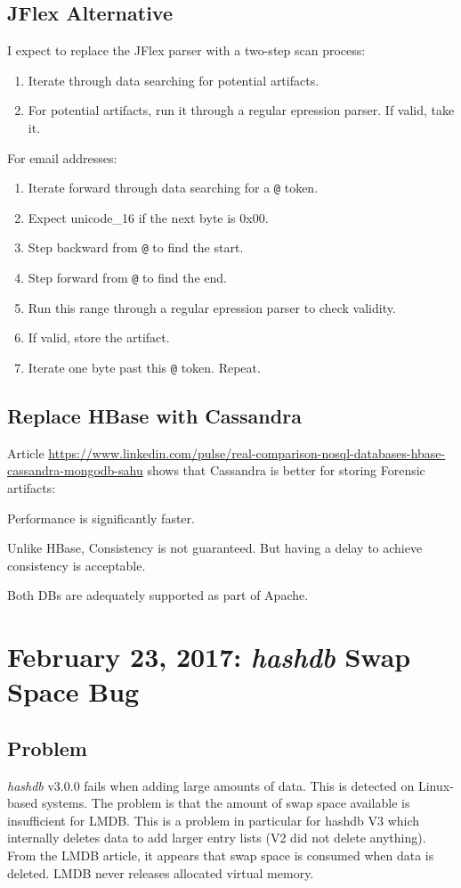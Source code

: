 \documentclass[12pt,twoside]{article}
\newcommand \hdb {\textit{hashdb}\xspace}
\begin{document}
\subsection{JFlex Alternative}
I expect to replace the JFlex parser with a two-step scan process:
\begin{enumerate}
\item Iterate through data searching for potential artifacts.
\item For potential artifacts, run it through a regular epression parser. If valid, take it.
\end{enumerate}
For email addresses:
\begin{enumerate}
\item Iterate forward through data searching for a \verb+@+ token.
\item Expect unicode\_16 if the next byte is 0x00.
\item Step backward from \verb+@+ to find the start.
\item Step forward from \verb+@+ to find the end.
\item Run this range through a regular epression parser to check validity.
\item If valid, store the artifact.
\item Iterate one byte past this \verb+@+ token.  Repeat.
\end{enumerate}

\subsection{Replace HBase with Cassandra}
Article \url{https://www.linkedin.com/pulse/real-comparison-nosql-databases-hbase-cassandra-mongodb-sahu} shows that Cassandra is better for storing Forensic artifacts:
\begin{compactitem}
\item Performance is significantly faster.
\item Unlike HBase, Consistency is not guaranteed. But having a delay to achieve consistency is acceptable.
\item Both DBs are adequately supported as part of Apache.
\end{compactitem}

\section{February 23, 2017: \hdb Swap Space Bug}
\subsection{Problem}
\hdb v3.0.0 fails when adding large amounts of data.
This is detected on Linux-based systems.
The problem is that the amount of swap space available is
insufficient for LMDB.  This is a problem in particular for hashdb V3
which internally deletes data to add larger entry lists (V2 did not
delete anything).  From the LMDB article, it appears that swap space is
consumed when data is deleted.  LMDB never releases allocated virtual memory.\\
\end{document}
